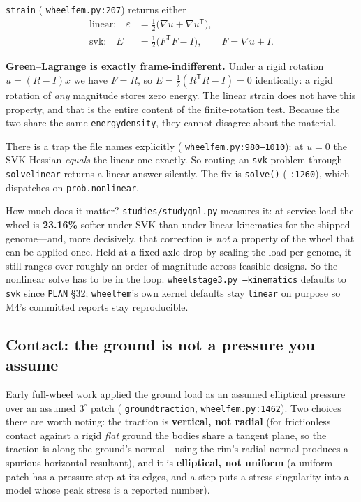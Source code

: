 \documentclass[11pt,a4paper]{article}
\DeclareRobustCommand{\code}[1]{%
  \texttt{\small\def\_{\textunderscore\discretionary{}{}{}}#1}}
\newcommand{\at}[2]{\code{#1:#2}}
\begin{document}
\code{\_strain} (\at{wheel\_fem.py}{207}) returns either
%
\begin{align}
  \text{linear:}\quad \varepsilon &= \tfrac12\bigl(\nabla u + \nabla u^{\mathsf T}\bigr),
  \\
  \text{svk:}\quad E &= \tfrac12\bigl(F^{\mathsf T}F - I\bigr),
  \qquad F = \nabla u + I .
\end{align}

\textbf{Green--Lagrange is exactly frame-indifferent.} Under a rigid rotation
$u = (R - I)x$ we have $F = R$, so $E = \tfrac12(R^{\mathsf T}R - I) = 0$ identically:
a rigid rotation of \emph{any} magnitude stores zero energy. The linear strain does not
have this property, and that is the entire content of the finite-rotation test. Because
the two share the same \code{\_energy\_density}, they cannot disagree about the
material.

There is a trap the file names explicitly (\at{wheel\_fem.py}{980--1010}): at $u = 0$
the SVK Hessian \emph{equals} the linear one exactly. So routing an \code{svk} problem
through \code{solve\_linear} returns a linear answer silently. The fix is
\code{solve()} (\code{:1260}), which dispatches on \code{prob.nonlinear}.

How much does it matter? \code{studies/study\_gnl.py} measures it: at service load the
wheel is \textbf{23.16\%} softer under SVK than under linear kinematics for the shipped
genome---and, more decisively, that correction is \emph{not} a property of the wheel
that can be applied once. Held at a fixed axle drop by scaling the load per genome, it
still ranges over roughly an order of magnitude across feasible designs. So the
nonlinear solve has to be in the loop. \code{wheel\_stage3.py --kinematics} defaults to
\code{svk} since \code{PLAN} \S32; \code{wheel\_fem}'s own kernel defaults stay
\code{linear} on purpose so M4's committed reports stay reproducible.

\subsection{Contact: the ground is not a pressure you assume}
\label{sec:contact}

Early full-wheel work applied the ground load as an assumed elliptical pressure over an
assumed $3^\circ$ patch (\code{\_ground\_traction}, \at{wheel\_fem.py}{1462}). Two
choices there are worth noting: the traction is \textbf{vertical, not radial} (for
frictionless contact against a rigid \emph{flat} ground the bodies share a tangent
plane, so the traction is along the ground's normal---using the rim's radial normal
produces a spurious horizontal resultant), and it is \textbf{elliptical, not uniform}
(a uniform patch has a pressure step at its edges, and a step puts a stress singularity
into a model whose peak stress is a reported number).
\end{document}
